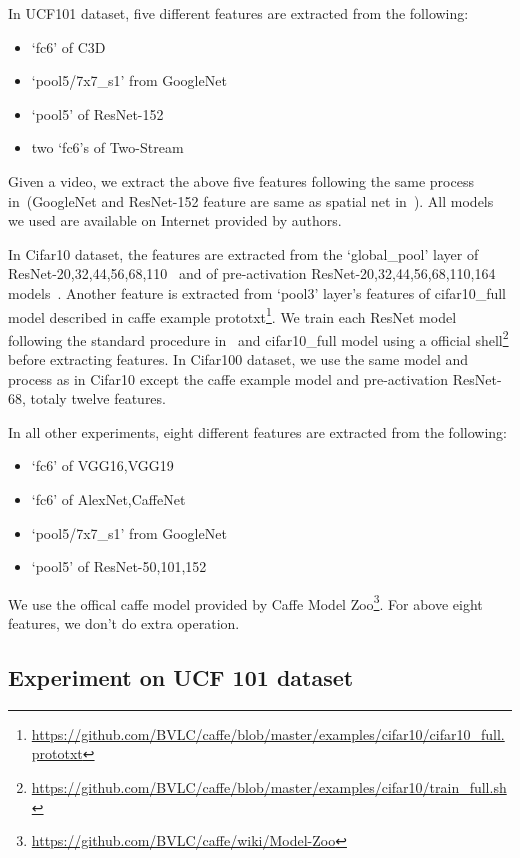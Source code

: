 \documentclass[letterpaper]{article}
\begin{document}
In UCF101 dataset, five different features are extracted from the following:
\begin{itemize}
  \item `fc6' of C3D~\cite{tran2015learning}
  \item `pool5/7x7\_s1' from GoogleNet~\cite{szegedy2015going}
  \item `pool5' of ResNet-152~\cite{he2015deep}
  \item two `fc6's of Two-Stream~\cite{simonyan2014two}
\end{itemize}
Given a video, we extract the above five features following the same process in~\cite{simonyan2014two,tran2015learning}(GoogleNet and ResNet-152 feature are same as spatial net in~\cite{simonyan2014two}). 
All models we used are available on Internet provided by authors.

In Cifar10 dataset, the features are extracted from the `global\_pool' layer of ResNet-20,32,44,56,68,110~\cite{he2015deep} and of pre-activation ResNet-20,32,44,56,68,110,164 models~\cite{he2016identity}. 
Another feature is extracted from `pool3' layer's features of cifar10\_full model described in caffe example prototxt\footnote{\url{https://github.com/BVLC/caffe/blob/master/examples/cifar10/cifar10_full.prototxt}}. 
We train each ResNet model following the standard procedure in~\cite{he2015deep,he2016identity} and cifar10\_full model using a official shell\footnote{\url{https://github.com/BVLC/caffe/blob/master/examples/cifar10/train_full.sh}} before extracting features. 
In Cifar100 dataset, we use the same model and process as in Cifar10 except the caffe example model and pre-activation ResNet-68, totaly twelve features.

In all other experiments, eight different features are extracted from the following:
\begin{itemize}
  \item `fc6' of VGG16,VGG19~\cite{chatfield2014return}
  \item `fc6' of AlexNet,CaffeNet~\cite{krizhevsky2012imagenet}
  \item `pool5/7x7\_s1' from GoogleNet~\cite{szegedy2015going}
  \item `pool5' of ResNet-50,101,152~\cite{he2015deep}
\end{itemize}
We use the offical caffe model provided by Caffe Model Zoo\footnote{\url{https://github.com/BVLC/caffe/wiki/Model-Zoo}}.
For above eight features, we don't do extra operation.


\subsection{Experiment on UCF 101 dataset}
\end{document}
